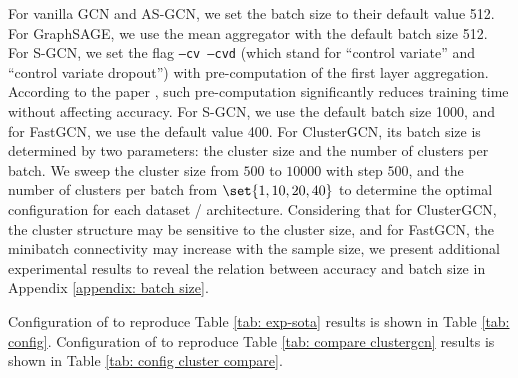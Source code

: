 For vanilla GCN and AS-GCN, we set the batch size to their default value 512. For GraphSAGE, we use the mean aggregator with the default batch size 512. For S-GCN, we set the flag \texttt{--cv --cvd} (which stand for ``control variate'' and ``control variate dropout'') with pre-computation of the first layer aggregation. According to the paper \citep{s-gcn}, such pre-computation significantly reduces training time without affecting accuracy. 
For S-GCN, we use the default batch size 1000, and for FastGCN, we use the default value 400.
For ClusterGCN, its batch size is determined by two parameters: the cluster size and the number of clusters per batch. We sweep the cluster size from $500$ to $10000$ with step $500$, and the number of clusters per batch from $\set{1,10,20,40}$ to determine the optimal configuration for each dataset / architecture. 
Considering that for ClusterGCN, the cluster structure may be sensitive to the cluster size, and for FastGCN, the minibatch connectivity may increase with the sample size, we present additional experimental results to reveal the relation between accuracy and batch size in Appendix \ref{appendix: batch size}.

Configuration of {\graphsaint} to reproduce Table \ref{tab: exp-sota} results is shown in Table \ref{tab: config}.
Configuration of {\graphsaint} to reproduce Table \ref{tab: compare clustergcn} results is shown in Table \ref{tab: config cluster compare}.%



